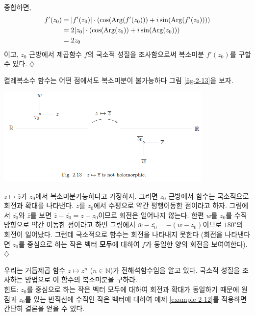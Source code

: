 \begin{saltexample}[label=example-2-12]{}{}
종합하면,
\begin{align*}
f'(z_0) &= |f'(z_0)| \cdot
\left( \cos(\mathop{\mathrm{Arg}}(f'(z_0))) + i \sin(\mathop{\mathrm{Arg}}(f'(z_0))) \right) \\
&= 2|z_0|\cdot \left(\cos(\mathop{\mathrm{Arg}}(z_0)) + i \sin(\mathop{\mathrm{Arg}}(z_0)) \right) \\
&= 2z_0
\end{align*}
이고,
$z_0$ 근방에서 제곱함수 $f$의 국소적 성질을 조사함으로써
복소미분 $f'(z_0)$를 구할 수 있다.
\hfill $\diamondsuit$
\end{saltexample}

\begin{saltexample}[label=example-2-13]{켤레복소수 함수는 어떤 점에서도 복소미분이 불가능하다}{}
그림 \ref{fig-2-13}을 보자.

\begin{center}
\includegraphics[width=0.8\textwidth]{./SaltChapter/fig-2-13}
\end{center}
\label{fig-2-13}

$z\mapsto \bar z$가 $z_0$에서 복소미분가능하다고 가정하자.
그러면 $z_0$ 근방에서 함수는 국소적으로 회전과 확대를 나타낸다.
$z$를 $z_0$에서 수평으로 약간 평행이동한 점이라고 하자.
그림에서 $\overline{z_0}$와 $\bar z$를 보면
$\bar z - \overline{z_0} = z-z_0$이므로 회전은 일어나지 않는다.
한편 $w$를 $z_0$를 수직방향으로 약간 이동한 점이라고 하면
그림에서 $\bar w - \overline{z_0} =  - (w-z_0)$이므로
$180^\circ$의 회전이 일어났다.
그런데 국소적으로 함수는 회전을 나타내지 못한다
(회전을 나타낸다면 $z_0$를 중심으로 하는  작은 벡터 {\bf 모두}에 대하여 
$f$가 동일한 양의 회전을 보여여한다).
\hfill $\diamondsuit$
\end{saltexample}

\begin{salt_exercise}\label{ex-2-16}
우리는 거듭제곱 함수 $z\mapsto z^n$ ($n\in\mathbb N$)가 전해석함수임을 알고 있다.
국소적 성질을 조사하는 방법으로 이 함수의 복소미분을 구하라. \\[1ex]
힌트:  $z_0$를 중심으로 하는  작은 벡터 모두에 대하여
회전과 확대가 동일하기 때문에
원점과 $z_0$를 있는 반직선에 수직인 작은 벡터에 대하여 
예제 \ref{example-2-12}를 적용하면 간단히 결론을 얻을 수 있다.
\end{salt_exercise}

